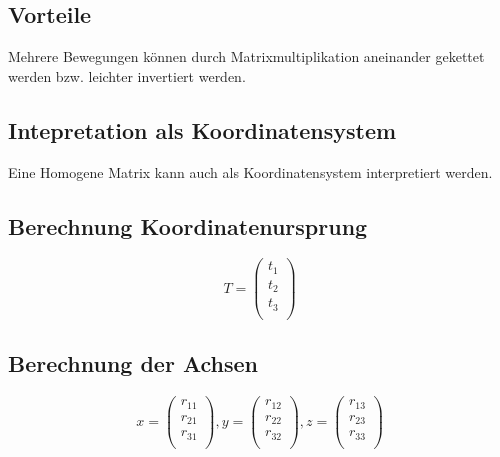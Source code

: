 \subsection{Vorteile}
	Mehrere Bewegungen können durch Matrixmultiplikation aneinander gekettet werden bzw. leichter invertiert werden.

\subsection{Intepretation als Koordinatensystem}

Eine Homogene Matrix kann auch als Koordinatensystem interpretiert werden. 



\subsection{Berechnung Koordinatenursprung}

\begin{equation}
T
=
\left(
\begin{array}{c}
t_{1} \\
t_{2} \\
t_{3} \\
\end{array}
\right)	
\end{equation}


\subsection{Berechnung der Achsen}
\begin{equation}
x =
\left(
\begin{array}{c}
r_{11}  \\
r_{21} \\
r_{31} \\
\end{array}
\right),	
y =
\left(
\begin{array}{c}
r_{12}  \\
r_{22} \\
r_{32} \\
\end{array}
\right),	
z =
\left(
\begin{array}{c}
r_{13}  \\
r_{23} \\
r_{33} \\
\end{array}
\right)	
\end{equation}


